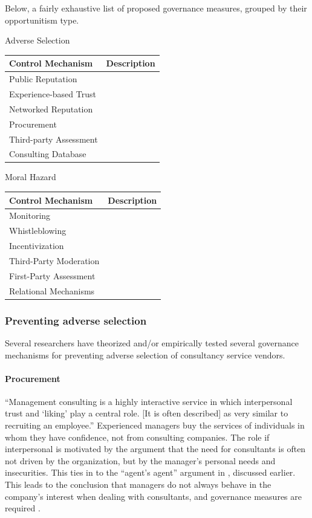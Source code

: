 \documentclass[12pt]{article}
\begin{document}
Below, a fairly exhaustive list of proposed governance measures, grouped
by their opportunitism type.

Adverse Selection

\begin{longtable}[]{@{}ll@{}}
\toprule\noalign{}
Control Mechanism & Description \\
\midrule\noalign{}
\endhead
\bottomrule\noalign{}
\endlastfoot
Public Reputation & \\
Experience-based Trust & \\
Networked Reputation & \\
Procurement & \\
Third-party Assessment & \\
Consulting Database & \\
\end{longtable}

Moral Hazard

\begin{longtable}[]{@{}ll@{}}
\toprule\noalign{}
Control Mechanism & Description \\
\midrule\noalign{}
\endhead
\bottomrule\noalign{}
\endlastfoot
Monitoring & \\
Whistleblowing & \\
Incentivization & \\
Third-Party Moderation & \\
First-Party Assessment & \\
Relational Mechanisms & \\
\end{longtable}

\subsubsection{Preventing adverse
selection}\label{preventing-adverse-selection}

Several researchers have theorized and/or empirically tested several
governance mechanisms for preventing adverse selection of consultancy
service vendors.

\paragraph{Procurement}\label{procurement}

``Management consulting is a highly interactive service in which
interpersonal trust and `liking' play a central role. {[}It is often
described{]} as very similar to recruiting an employee.'' \citep[
185]{furusten2005} Experienced managers buy the services of individuals
in whom they have confidence, not from consulting companies. The role if
interpersonal is motivated by the argument that the need for consultants
is often not driven by the organization, but by the manager's personal
needs and insecurities. This ties in to the ``agent's agent'' argument
in \citet{fincham2002}, discussed earlier. This leads to the conclusion
that managers do not always behave in the company's interest when
dealing with consultants, and governance measures are required \citep[
300]{honer2006}.
\end{document}
